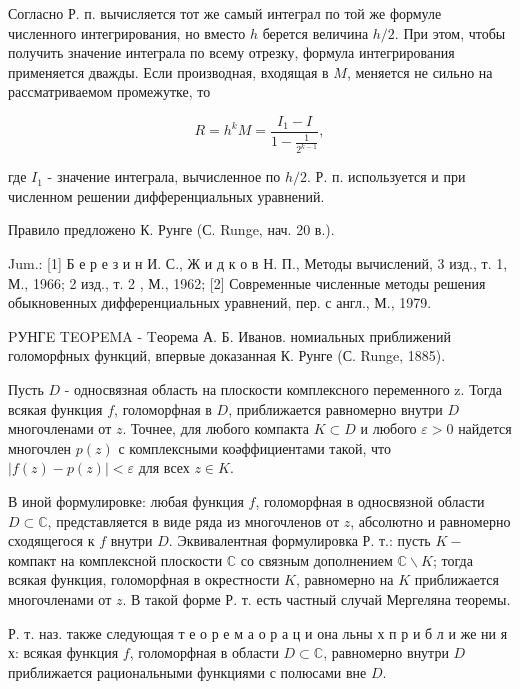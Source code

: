 \documentclass[10pt]{article}
\begin{document}
Согласно Р. п. вычисляется тот же самый интеграл по той же формуле численного интегрирования, но вместо $h$ берется величина $h / 2$. При этом, чтобы получить значение интеграла по всему отрезку, формула интегрирования применяется дважды. Если производная, входящая в $M$, меняется не сильно на рассматриваемом промежутке, то



\[

R=h^{k} M=\frac{I_{1}-I}{1-\frac{1}{2^{k-1}}},

\]



где $I_{1}$ - значение интеграла, вычисленное по $h / 2$. Р. п. используется и при численном решении дифференциальных уравнений.



Правило предложено К. Рунге (С. Runge, нач. 20 в.).



Jum.: [1] Б е р е з и н И. С., Ж и д к о в Н. П., Методы вычислений, 3 изд., т. 1, М., 1966; 2 изд., т. 2 , М., 1962; [2] Современные численные методы решения обыкновенных дифференциальных уравнений, пер. с англ., М., 1979.



PУНГE TEOPEMA - Tеорема А. Б. Иванов. номиальных приближений голоморфных функций, впервые доказанная К. Рунге (С. Runge, 1885).



Пусть $D$ - односвязная область на плоскости комплексного переменного z. Тогда всякая функция $f$, голоморфная в $D$, приближается равномерно внутри $D$ многочленами от $z$. Точнее, для любого компакта $K \subset D$ и любого $\varepsilon>0$ найдется многочлен $p(z)$ с комплексными коәффициентами такой, что $|f(z)-p(z)|<\varepsilon$ для всех $z \in K$.



В иной формулировке: любая функция $f$, голоморфная в односвязной области $D \subset \mathbb{C}$, представляется в виде ряда из многочленов от $z$, абсолютно и равномерно сходящегося к $f$ внутри $D$. Эквивалентная формулировка Р. т.: пусть $K-$ компакт на комплексной плоскости $\mathbb{C}$ со связным дополнением $\mathbb{C} \backslash K$; тогда всякая функция, голоморфная в окрестности $K$, равномерно на $K$ приближается многочленами от $z$. В такой форме Р. т. есть частный случай Мергеляна теоремы.



Р. т. наз. также следующая т е о р е м а о р а ц и она льны х п р и б л и же ни я х: всякая функция $f$, голоморфная в области $D \subset \mathbb{C}$, равномерно внутри $D$ приближается рациональными функциями с полюсами вне $D$.
\end{document}
